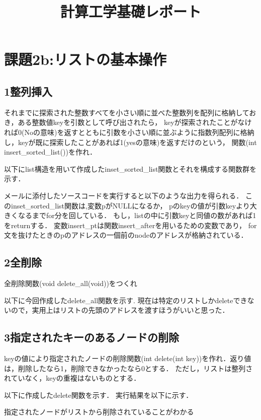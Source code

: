 \documentclass[titlepage]{jarticle}
\title{計算工学基礎レポート}
\author{}
\begin{document}
\section*{課題2b:リストの基本操作}
\subsection*{1整列挿入}

それまでに探索された整数すべてを小さい順に並べた整数列を配列に格納しておき，ある整数値keyを引数として呼び出されたら，
keyが探索されたことがなければ0(Noの意味)を返すとともに引数を小さい順に並ぶように指数列配列に格納し，keyが既に探索したことがあれば1(yesの意味)を返すだけのという，
関数(int insert\_sorted\_list())を作れ． 

以下にlist構造を用いて作成したinset\_sorted\_list関数とそれを構成する関数群を示す．

メールに添付したソースコードを実行すると以下のような出力を得られる．
このinset\_sorted\_list関数は,変数pがNULLになるか，
pのkeyの値が引数keyより大きくなるまでfor分を回している．
もし，listの中に引数keyと同値の数があれば1をreturnする．
変数insert\_ptは関数insert\_afterを用いるための変数であり，
for文を抜けたときのpのアドレスの一個前のnodeのアドレスが格納されている．
\subsection*{2全削除}
全削除関数(void delete\_all(void))をつくれ

以下に今回作成したdelete\_all関数を示す.
現在は特定のリストしかdeleteできないので，実用上はリストの先頭のアドレスを渡すほうがいいと思った．
\subsection*{3指定されたキーのあるノードの削除}
keyの値により指定されたノードの削除関数(int delete(int key))を作れ．返り値は，削除したなら1，削除できなかったなら0とする．
ただし，リストは整列されていなく，keyの重複はないものとする．

以下に作成したdelete関数を示す．
実行結果を以下に示す．

指定されたノードがリストから削除されていることがわかる
\end{document}
